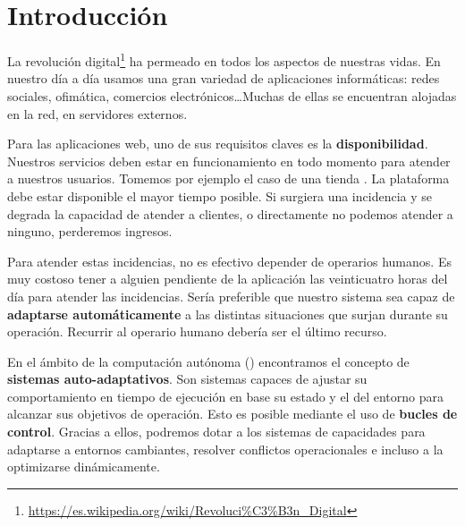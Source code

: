 
\chapter{Introducción}
\label{chap:introduccion}

La revolución digital\footnote{\url{https://es.wikipedia.org/wiki/Revoluci\%C3\%B3n_Digital}} ha permeado en todos los aspectos de nuestras vidas. En nuestro día a día usamos una gran variedad de aplicaciones informáticas: redes sociales, ofimática, comercios electrónicos\dots Muchas de ellas se encuentran alojadas en la red, en servidores externos.

Para las aplicaciones web, uno de sus requisitos claves es la \textbf{disponibilidad}. \cite{birmanAddingHighAvailability2004} Nuestros servicios deben estar en funcionamiento en todo momento para atender a nuestros usuarios. Tomemos por ejemplo el caso de una tienda . La plataforma debe estar disponible el mayor tiempo posible. Si surgiera una incidencia y se degrada la capacidad de atender a clientes, o directamente no podemos atender a ninguno, perderemos ingresos.

Para atender estas incidencias, no es efectivo depender de operarios humanos. \cite{ibmcorporationArchitecturalBlueprintAutonomic2006} Es muy costoso tener a alguien pendiente de la aplicación las veinticuatro horas del día para atender las incidencias. Sería preferible que nuestro sistema sea capaz de \textbf{adaptarse automáticamente} a las distintas situaciones que surjan durante su operación. Recurrir al operario humano debería ser el último recurso.

En el ámbito de la computación autónoma () encontramos el concepto de \textbf{sistemas auto-adaptativos}. Son sistemas capaces de ajustar su comportamiento en tiempo de ejecución en base su estado y el del entorno para alcanzar sus objetivos de operación. \cite{ibmcorporationArchitecturalBlueprintAutonomic2006} Esto es posible mediante el uso de \textbf{bucles de control}. \cite{brunEngineeringSelfAdaptiveSystems2009} Gracias a ellos, podremos dotar a los sistemas de capacidades para adaptarse a entornos cambiantes, resolver conflictos operacionales e incluso a la optimizarse dinámicamente.

